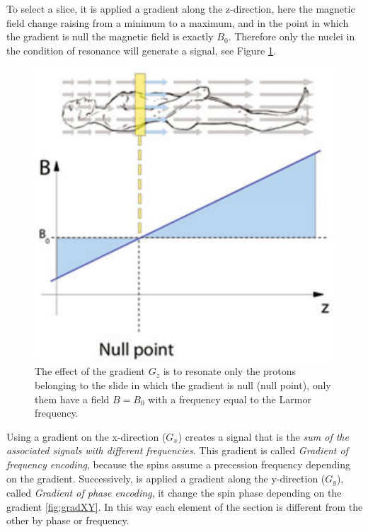 \noindent To select a slice, it is applied a gradient along the z-direction, here the magnetic field change raising from a minimum to a maximum, and in the point in which the gradient is null the magnetic field is exactly $B_0$. Therefore only the nuclei in the condition of resonance will generate a signal, see Figure \ref{fig:gradientZ}.

 \begin{figure}[h]
   \centering
   \begin{minipage}[c]{0.3\textwidth}
      \includegraphics[width=\textwidth]{images/gradZ.png}
   \end{minipage}\hfill
   \begin{minipage}[b]{0.65\textwidth}
      \caption{The effect of the gradient $G_z$ is to resonate only the protons belonging to the slide in which the gradient is null (null point), only them have a field $B = B_0$ with a frequency equal to the Larmor frequency. \cite{elementiRisonanza}}
      \label{fig:gradientZ}
   \end{minipage}
 \end{figure}

 \noindent Using a gradient on the x-direction ($G_x$) creates a signal that is the \emph{sum of the associated signals with different frequencies}. This gradient is called \emph{Gradient of frequency encoding}, because the spins assume a precession frequency depending on the gradient. Successively, is applied a gradient along the y-direction ($G_y$), called \emph{Gradient of phase encoding}, it change the spin phase depending on the gradient \ref{fig:gradXY}. In this way each element of the section is different from the other by phase or frequency.

